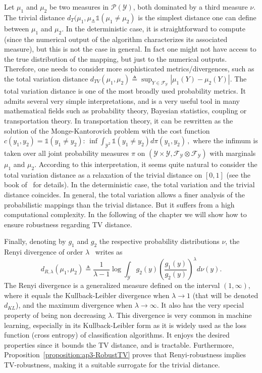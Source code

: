 Let  $\mu_1$ and $\mu_2$ be two measures in $\mathcal{P}(\mathcal{Y})$, both dominated by a third measure $\nu$.
The trivial distance $ d_{T}(\mu_1,\mu_ \triangleq \mathds{1}\left(\mu_1 \neq \mu_2\right)$ is the simplest distance one can define between $\mu_1$ and $\mu_2$.
In the deterministic case, it is straightforward to compute (since the numerical output of the algorithm characterizes its associated measure), but this is not the case in general.
In fact one might not have access to the true distribution of the mapping, but just to the numerical outputs.
Therefore, one needs to consider more sophisticated metrics/divergences, such as the total variation distance $d_{TV}(\mu_1,\mu_2) \triangleq \sup_{Y \in \mathcal{F}_{\mathcal{Y}}} |\mu_1 (Y) - \mu_2(Y)|$.
The total variation distance is one of the most broadly used probability metrics.
It admits several very simple interpretations, and is a very useful tool in many mathematical fields such as probability theory, Bayesian statistics, coupling or transportation theory.
In transportation theory, it can be rewritten as the solution of the Monge-Kantorovich problem with the cost function $c(y_1,y_2) =\mathds{1}\left(y_1 \neq y_2\right)$: $ \inf\int_{\mathcal{Y}^{2}}\mathds{1}\left(y_1 \neq y_2\right) d\pi(y_1,y_2)\, ,$ where the infimum is taken over all joint probability measures $\pi$ on $(\mathcal{Y}\times \mathcal{Y}, \mathcal{F}_{\mathcal{Y} } \otimes \mathcal{F}_{\mathcal{Y}})$ with marginals $\mu_1$ and $\mu_2$.
According to this interpretation, it seems quite natural to consider the total variation distance as a relaxation of the trivial distance on $[0,1]$ (see the book of~\citet{villani2008optimal} for details).
In the deterministic case, the total variation and the trivial distance coincides.
In general, the total variation allows a finer analysis of the probabilistic mappings than the trivial distance.
But it suffers from a high computational complexity.
In the following of the chapter we will show how to ensure robustness regarding TV distance.

Finally, denoting by $g_1$ and $g_2$ the respective probability distributions \wrt $\nu$, the Renyi divergence of order $\lambda$~\cite{renyi1961} writes as  
\begin{equation}
  d_{R,\lambda}(\mu_1,\mu_2) \triangleq \frac{1}{\lambda -1}\log \int_{\mathcal{Y}} g_2(y)  \left(\frac{g_1(y)}{g_2(y)}\right)^{\lambda} d\nu(y).
\end{equation}
The Renyi divergence is a generalized measure defined on the interval $(1,\infty)$, where it equals the Kullback-Leibler divergence when $\lambda \rightarrow 1$ (that will be denoted $d_{KL}$), and the maximum divergence when $\lambda \rightarrow \infty$.
It also has the very special property of being non decreasing \wrt $\lambda$.
This divergence is very common in machine learning, especially in its Kullback-Leibler form as it is widely used as the loss function (cross entropy) of classification algorithms.
It enjoys the desired properties  since it bounds the TV distance, and is tractable.
Furthermore, Proposition~\ref{proposition:ap3-RobustTV} proves that Renyi-robustness implies TV-robustness, making it a suitable surrogate for the trivial distance.

